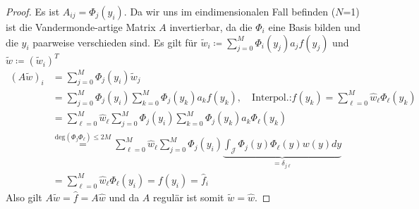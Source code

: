 \begin{proof}
Es ist $A_{ij}=\Phi_j(y_i)$. Da wir uns im eindimensionalen Fall befinden ($N$=1) ist die Vandermonde-artige Matrix $A$ invertierbar, da die $\Phi_i$ eine Basis bilden und die $y_i$ paarweise verschieden sind. Es gilt für $\widetilde{w}_i\coloneqq \sum_{j=0}^M\Phi_i(y_j)a_jf(y_j)$ und $\widetilde{w}\coloneqq (\widetilde{w}_i)^T$
\begin{align*}
\left(A\widetilde{w}\right)_i&=\sum_{j=0}^M\Phi_j(y_i)\widetilde{w}_j\\
&=\sum_{j=0}^M\Phi_j(y_i)\sum_{k=0}^M\Phi_j(y_k)a_kf(y_k),\quad \text{Interpol.:} f(y_k)=\sum_{\ell=0}^M\hat{w}_\ell\Phi_\ell(y_k)\\
&=\sum_{\ell=0}^M\hat{w}_\ell \sum_{j=0}^M\Phi_j(y_i)\sum_{k=0}^M\Phi_j(y_k)a_k\Phi_\ell(y_k)\\
&\stackrel{\text{deg}(\Phi_j\Phi_\ell)\le 2M}{=}\sum_{\ell=0}^M\hat{w}_\ell\sum_{j=0}^M\Phi_j(y_i)\underbrace{\int_\mathcal{J}\Phi_j(y)\Phi_\ell(y)w(y)dy}_{=\delta_{j\ell}}\\
&=\sum_{\ell=0}^M\hat{w}_\ell\Phi_\ell(y_i)=f(y_i)=\hat{f}_i
\end{align*}
Also gilt $A\widetilde{w}=\hat{f}=A\hat{w}$ und da $A$ regulär ist somit $\widetilde{w}=\hat{w}$.
\end{proof}
